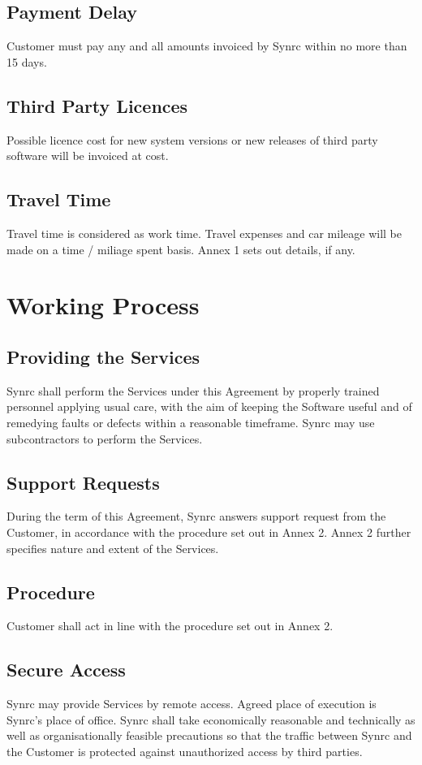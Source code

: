 \documentclass[11pt,oneside]{article}
\begin{document}
\subsection{Payment Delay}
Customer must pay any and all amounts invoiced by Synrc within no
more than 15 days.
\subsection{Third Party Licences}
Possible licence cost for new system versions or new releases of
third party software will be invoiced at cost.
\subsection{Travel Time}
Travel time is considered as work time. Travel expenses and car mileage
will be made on a time / miliage spent basis. Annex 1 sets out details, if any.

\section{Working Process}
\subsection{Providing the Services}
Synrc shall perform the Services under this Agreement by properly trained personnel
applying usual care, with the aim of keeping the Software useful and of remedying
faults or defects within a reasonable timeframe. Synrc may use subcontractors
to perform the Services.
\subsection{Support Requests}
During the term of this Agreement, Synrc answers support request from the Customer,
in accordance with the procedure set out in Annex 2. Annex 2 further specifies
nature and extent of the Services.
\subsection{Procedure}
Customer shall act in line with the procedure set out in Annex 2.
\subsection{Secure Access}
Synrc may provide Services by remote access. Agreed place of execution is Synrc's place
of office. Synrc shall take economically reasonable and technically as well as
organisationally feasible precautions so that the traffic between Synrc and
the Customer is protected against unauthorized access by third parties.
\end{document}
